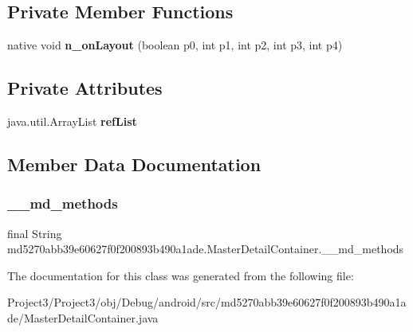 \subsection*{Private Member Functions}
\begin{DoxyCompactItemize}
\item 
\mbox{\label{classmd5270abb39e60627f0f200893b490a1ade_1_1MasterDetailContainer_a0582c744ccf98d251edbc86dec6b8feb}} 
native void {\bfseries n\+\_\+on\+Layout} (boolean p0, int p1, int p2, int p3, int p4)
\end{DoxyCompactItemize}
\subsection*{Private Attributes}
\begin{DoxyCompactItemize}
\item 
\mbox{\label{classmd5270abb39e60627f0f200893b490a1ade_1_1MasterDetailContainer_ac49f1f25904383f281279d9ee9f9fba0}} 
java.\+util.\+Array\+List {\bfseries ref\+List}
\end{DoxyCompactItemize}


\subsection{Member Data Documentation}
\mbox{\label{classmd5270abb39e60627f0f200893b490a1ade_1_1MasterDetailContainer_ac82bf846b500c62b8736305937c47350}} 
\subsubsection{\texorpdfstring{\+\_\+\+\_\+md\+\_\+methods}{\_\_md\_methods}}
{\footnotesize\ttfamily final String md5270abb39e60627f0f200893b490a1ade.\+Master\+Detail\+Container.\+\_\+\+\_\+md\+\_\+methods\hspace{0.3cm}{\ttfamily [static]}}



The documentation for this class was generated from the following file\+:\begin{DoxyCompactItemize}
\item 
Project3/\+Project3/obj/\+Debug/android/src/md5270abb39e60627f0f200893b490a1ade/Master\+Detail\+Container.\+java\end{DoxyCompactItemize}
